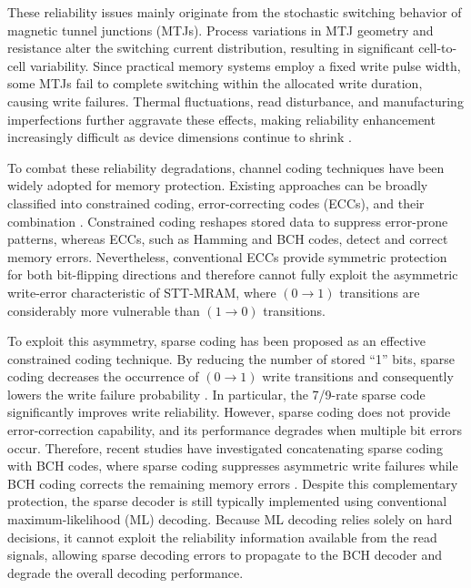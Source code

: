 \documentclass[conference]{IEEEtran}
\begin{document}
These reliability issues mainly originate from the stochastic switching behavior of magnetic tunnel junctions (MTJs). Process variations in MTJ geometry and resistance alter the switching current distribution, resulting in significant cell-to-cell variability. Since practical memory systems employ a fixed write pulse width, some MTJs fail to complete switching within the allocated write duration, causing write failures. Thermal fluctuations, read disturbance, and manufacturing imperfections further aggravate these effects, making reliability enhancement increasingly difficult as device dimensions continue to shrink \cite{wu2020survey}.

To combat these reliability degradations, channel coding techniques have been widely adopted for memory protection. Existing approaches can be broadly classified into constrained coding, error-correcting codes (ECCs), and their combination \cite{nguyen2026error}. Constrained coding reshapes stored data to suppress error-prone patterns, whereas ECCs, such as Hamming and BCH codes, detect and correct memory errors. Nevertheless, conventional ECCs provide symmetric protection for both bit-flipping directions and therefore cannot fully exploit the asymmetric write-error characteristic of STT-MRAM, where $(0 \rightarrow 1)$ transitions are considerably more vulnerable than $(1 \rightarrow 0)$ transitions.

To exploit this asymmetry, sparse coding has been proposed as an effective constrained coding technique. By reducing the number of stored ``1'' bits, sparse coding decreases the occurrence of $(0 \rightarrow 1)$ write transitions and consequently lowers the write failure probability \cite{nguyen2021design}. In particular, the 7/9-rate sparse code significantly improves write reliability. However, sparse coding does not provide error-correction capability, and its performance degrades when multiple bit errors occur. Therefore, recent studies have investigated concatenating sparse coding with BCH codes, where sparse coding suppresses asymmetric write failures while BCH coding corrects the remaining memory errors \cite{nguyen2026error}. Despite this complementary protection, the sparse decoder is still typically implemented using conventional maximum-likelihood (ML) decoding. Because ML decoding relies solely on hard decisions, it cannot exploit the reliability information available from the read signals, allowing sparse decoding errors to propagate to the BCH decoder and degrade the overall decoding performance.
\end{document}
